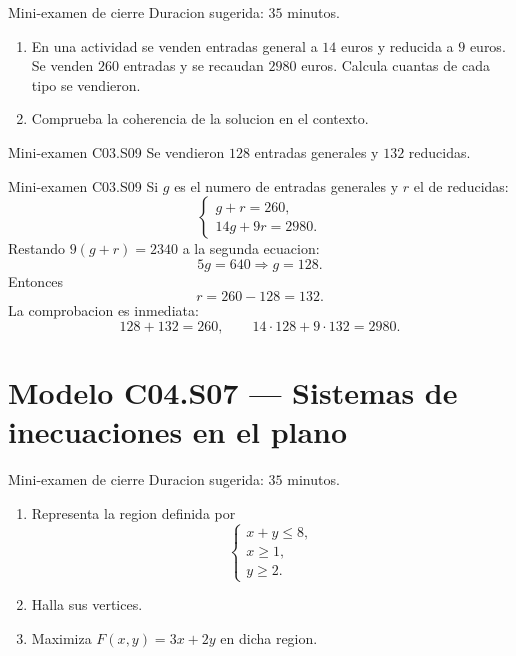 \begin{exambrief}{Mini-examen de cierre}
Duracion sugerida: \(35\) minutos.
\begin{enumerate}
  \item En una actividad se venden entradas general a \(14\) euros y reducida a \(9\) euros.
  Se venden \(260\) entradas y se recaudan \(2980\) euros. Calcula cuantas de cada tipo se
  vendieron.
  \item Comprueba la coherencia de la solucion en el contexto.
\end{enumerate}
\end{exambrief}

\begin{shortanswer}{Mini-examen C03.S09}
Se vendieron \(128\) entradas generales y \(132\) reducidas.
\end{shortanswer}

\begin{fullsolution}{Mini-examen C03.S09}
Si \(g\) es el numero de entradas generales y \(r\) el de reducidas:
\[
\begin{cases}
g+r=260,\\
14g+9r=2980.
\end{cases}
\]
Restando \(9(g+r)=2340\) a la segunda ecuacion:
\[
5g=640 \Longrightarrow g=128.
\]
Entonces
\[
r=260-128=132.
\]
La comprobacion es inmediata:
\[
128+132=260,\qquad 14\cdot 128+9\cdot 132=2980.
\]
\end{fullsolution}

\section{Modelo C04.S07 --- Sistemas de inecuaciones en el plano}

\begin{exambrief}{Mini-examen de cierre}
Duracion sugerida: \(35\) minutos.
\begin{enumerate}
  \item Representa la region definida por
  \[
  \begin{cases}
  x+y\leq 8,\\
  x\geq 1,\\
  y\geq 2.
  \end{cases}
  \]
  \item Halla sus vertices.
  \item Maximiza \(F(x,y)=3x+2y\) en dicha region.
\end{enumerate}
\end{exambrief}


